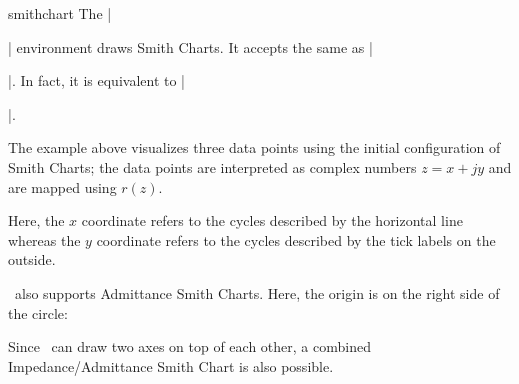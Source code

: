 \begin{environment}{{smithchart}}
	The |\begin{smithchart}| environment draws Smith Charts. It accepts the same  as |\begin{axis}|. In fact, it is equivalent to |\begin{axis}[|\meta{options}|,axis type=smithchart]|.
\begin{codeexample}[]
\end{codeexample}
	The example above visualizes three data points using the initial configuration of Smith Charts; the data points are interpreted as complex numbers $z = x + j y$ and are mapped using $r(z)$.

	Here, the $x$ coordinate refers to the cycles described by the horizontal line whereas the $y$ coordinate refers to the cycles described by the tick labels on the outside.

	\PGFPlots\ also supports Admittance Smith Charts. Here, the origin is on the right side of the circle:
\begin{codeexample}[]
\end{codeexample}

	Since \PGFPlots\ can draw two axes on top of each other, a combined Impedance/Admittance Smith Chart is also possible.
\begin{codeexample}[]
\end{codeexample}
\end{axis}
\end{axis}
\end{smithchart}
\end{environment}
